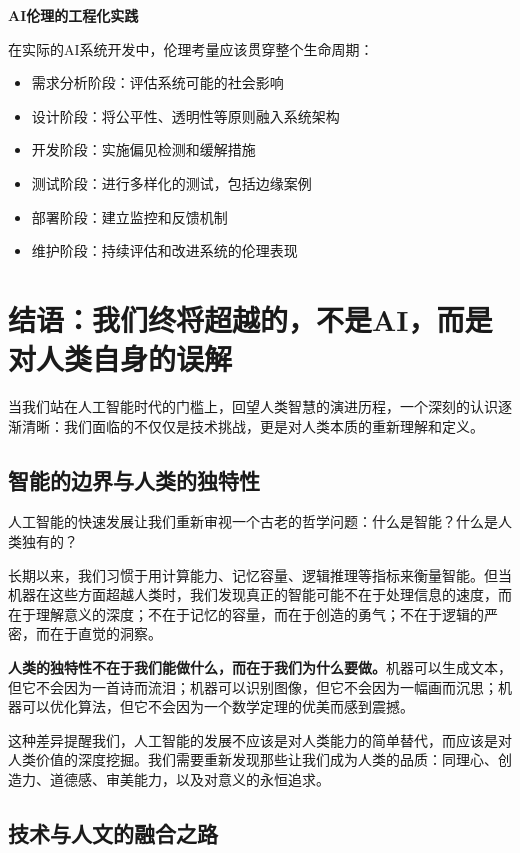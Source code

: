 \begin{center}
{\bf AI伦理的工程化实践}

在实际的AI系统开发中，伦理考量应该贯穿整个生命周期：
\begin{itemize}
\item 需求分析阶段：评估系统可能的社会影响
\item 设计阶段：将公平性、透明性等原则融入系统架构
\item 开发阶段：实施偏见检测和缓解措施
\item 测试阶段：进行多样化的测试，包括边缘案例
\item 部署阶段：建立监控和反馈机制
\item 维护阶段：持续评估和改进系统的伦理表现
\end{itemize}
\end{center}

\section*{结语：我们终将超越的，不是AI，而是对人类自身的误解}

当我们站在人工智能时代的门槛上，回望人类智慧的演进历程，一个深刻的认识逐渐清晰：我们面临的不仅仅是技术挑战，更是对人类本质的重新理解和定义。

\subsection*{智能的边界与人类的独特性}

人工智能的快速发展让我们重新审视一个古老的哲学问题：什么是智能？什么是人类独有的？

长期以来，我们习惯于用计算能力、记忆容量、逻辑推理等指标来衡量智能。但当机器在这些方面超越人类时，我们发现真正的智能可能不在于处理信息的速度，而在于理解意义的深度；不在于记忆的容量，而在于创造的勇气；不在于逻辑的严密，而在于直觉的洞察。

{\bf 人类的独特性不在于我们能做什么，而在于我们为什么要做。}机器可以生成文本，但它不会因为一首诗而流泪；机器可以识别图像，但它不会因为一幅画而沉思；机器可以优化算法，但它不会因为一个数学定理的优美而感到震撼。

这种差异提醒我们，人工智能的发展不应该是对人类能力的简单替代，而应该是对人类价值的深度挖掘。我们需要重新发现那些让我们成为人类的品质：同理心、创造力、道德感、审美能力，以及对意义的永恒追求。

\subsection*{技术与人文的融合之路}

